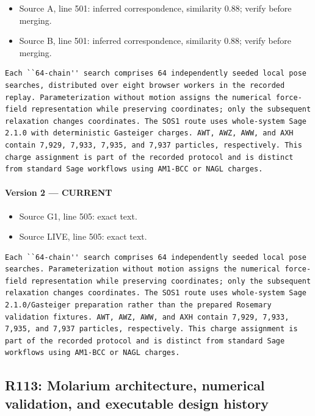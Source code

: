 \documentclass[11pt]{article}
\begin{document}
\begin{itemize}[leftmargin=*]
\item Source A, line 501: inferred correspondence, similarity 0.88; verify before merging.
\item Source B, line 501: inferred correspondence, similarity 0.88; verify before merging.
\end{itemize}

\begin{lstlisting}
Each ``64-chain'' search comprises 64 independently seeded local pose searches, distributed over eight browser workers in the recorded replay. Parameterization without motion assigns the numerical force-field representation while preserving coordinates; only the subsequent relaxation changes coordinates. The SOS1 route uses whole-system Sage 2.1.0 with deterministic Gasteiger charges. AWT, AWZ, AWW, and AXH contain 7,929, 7,933, 7,935, and 7,937 particles, respectively. This charge assignment is part of the recorded protocol and is distinct from standard Sage workflows using AM1-BCC or NAGL charges.
\end{lstlisting}

\paragraph{Version 2 --- CURRENT}

\begin{itemize}[leftmargin=*]
\item Source G1, line 505: exact text.
\item Source LIVE, line 505: exact text.
\end{itemize}

\begin{lstlisting}
Each ``64-chain'' search comprises 64 independently seeded local pose searches. Parameterization without motion assigns the numerical force-field representation while preserving coordinates; only the subsequent relaxation changes coordinates. The SOS1 route uses whole-system Sage 2.1.0/Gasteiger preparation rather than the prepared Rosemary validation fixtures. AWT, AWZ, AWW, and AXH contain 7,929, 7,933, 7,935, and 7,937 particles, respectively. This charge assignment is part of the recorded protocol and is distinct from standard Sage workflows using AM1-BCC or NAGL charges.
\end{lstlisting}

\subsection{R113: Molarium architecture, numerical validation, and executable design history}
\end{document}
